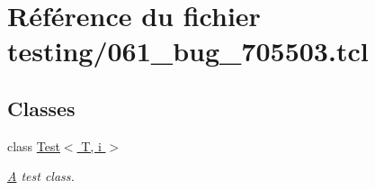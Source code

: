 \hypertarget{061__bug__705503_8tcl}{}\section{Référence du fichier testing/061\+\_\+bug\+\_\+705503.tcl}
\label{061__bug__705503_8tcl}
\subsection*{Classes}
\begin{DoxyCompactItemize}
\item 
class \hyperlink{class_test}{Test$<$ T, i $>$}
\begin{DoxyCompactList}\small\item\em \hyperlink{class_a}{A} test class. \end{DoxyCompactList}\end{DoxyCompactItemize}

